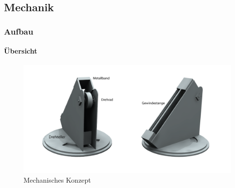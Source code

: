 \subsection{Mechanik}

\author{Christian Spycher}

\begin{frame}
	\frametitle{Aufbau\hfill{}\footnotesize \group}
	\framesubtitle{Übersicht}
	\begin{figure}
		\centering
		\includegraphics[width=1\textwidth]{../../fig/StudioLegende.png}
		\caption{Mechanisches Konzept}
	\end{figure}
\end{frame}

